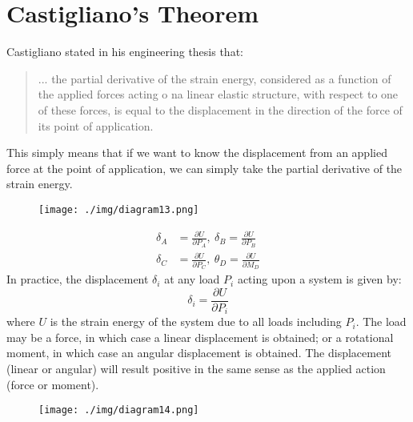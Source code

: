 \section{Castigliano's Theorem}
Castigliano stated in his engineering thesis that:
\begin{quotation}
  ... the partial derivative of the strain energy, considered as a function of the applied forces acting o na linear elastic structure, with respect to one of these forces, is equal to the displacement in the direction of the force of its point of application.
\end{quotation}
This simply means that if we want to know the displacement from an applied force at the point of application, we can simply take the partial derivative of the strain energy.
\begin{figure}[H]
  \centering
  \texttt{[image: ./img/diagram13.png]}
  \caption{}
\end{figure}
\begin{align}
  \delta_A & = \frac{\partial U}{\partial P_A}, \ \delta_B = \frac{\partial U}{\partial P_B} \\
  \delta_C & = \frac{\partial U}{\partial P_C}, \ \theta_D = \frac{\partial U}{\partial M_D}
\end{align}
In practice, the displacement $\delta_i$ at any load $P_i$ acting upon a system is given by:
\begin{equation}
  \delta_i = \frac{\partial U}{\partial P_i}
\end{equation}
where $U$ is the strain energy of the system due to all loads including $P_i$. The load may be a force, in which case a linear displacement is obtained; or a rotational moment, in which case an angular displacement is obtained. The displacement (linear or angular) will result positive in the same sense as the applied action (force or moment).
\begin{figure}[H]
  \centering
  \texttt{[image: ./img/diagram14.png]}
  \caption{}
\end{figure}
